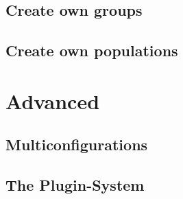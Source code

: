 \documentclass[parskip=full,11pt]{scrartcl}
\begin{document}
\subsection{Create own groups}

\subsection{Create own populations}

\section{Advanced}

\subsection{Multiconfigurations}

\subsection{The Plugin-System}
\end{document}
